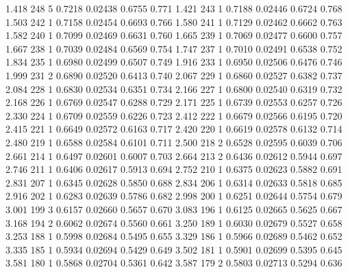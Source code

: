 \documentclass[handout,12pt,dvipsnames,t]{beamer}
\begin{document}
\begin{frame}[fragile]
{\begin{Schunk}
\begin{Soutput}
  1.418    248       5   0.7218 0.02438       0.6755        0.771
  1.421    243       1   0.7188 0.02446       0.6724        0.768
  1.503    242       1   0.7158 0.02454       0.6693        0.766
  1.580    241       1   0.7129 0.02462       0.6662        0.763
  1.582    240       1   0.7099 0.02469       0.6631        0.760
  1.665    239       1   0.7069 0.02477       0.6600        0.757
  1.667    238       1   0.7039 0.02484       0.6569        0.754
  1.747    237       1   0.7010 0.02491       0.6538        0.752
  1.834    235       1   0.6980 0.02499       0.6507        0.749
  1.916    233       1   0.6950 0.02506       0.6476        0.746
  1.999    231       2   0.6890 0.02520       0.6413        0.740
  2.067    229       1   0.6860 0.02527       0.6382        0.737
  2.084    228       1   0.6830 0.02534       0.6351        0.734
  2.166    227       1   0.6800 0.02540       0.6319        0.732
  2.168    226       1   0.6769 0.02547       0.6288        0.729
  2.171    225       1   0.6739 0.02553       0.6257        0.726
  2.330    224       1   0.6709 0.02559       0.6226        0.723
  2.412    222       1   0.6679 0.02566       0.6195        0.720
  2.415    221       1   0.6649 0.02572       0.6163        0.717
  2.420    220       1   0.6619 0.02578       0.6132        0.714
  2.480    219       1   0.6588 0.02584       0.6101        0.711
  2.500    218       2   0.6528 0.02595       0.6039        0.706
  2.661    214       1   0.6497 0.02601       0.6007        0.703
  2.664    213       2   0.6436 0.02612       0.5944        0.697
  2.746    211       1   0.6406 0.02617       0.5913        0.694
  2.752    210       1   0.6375 0.02623       0.5882        0.691
  2.831    207       1   0.6345 0.02628       0.5850        0.688
  2.834    206       1   0.6314 0.02633       0.5818        0.685
  2.916    202       1   0.6283 0.02639       0.5786        0.682
  2.998    200       1   0.6251 0.02644       0.5754        0.679
  3.001    199       3   0.6157 0.02660       0.5657        0.670
  3.083    196       1   0.6125 0.02665       0.5625        0.667
  3.168    194       2   0.6062 0.02674       0.5560        0.661
  3.250    189       1   0.6030 0.02679       0.5527        0.658
  3.253    188       1   0.5998 0.02684       0.5495        0.655
  3.329    186       1   0.5966 0.02689       0.5462        0.652
  3.335    185       1   0.5934 0.02694       0.5429        0.649
  3.502    181       1   0.5901 0.02699       0.5395        0.645
  3.581    180       1   0.5868 0.02704       0.5361        0.642
  3.587    179       2   0.5803 0.02713       0.5294        0.636

\end{Soutput}
\end{Schunk}}
\end{frame}
\end{document}
